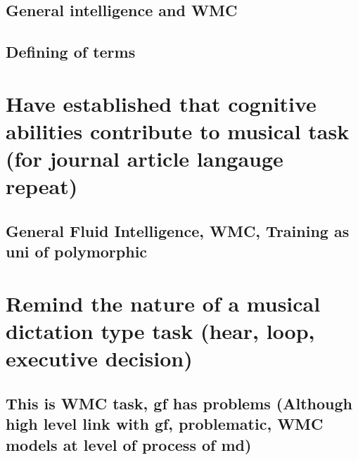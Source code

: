 \documentclass[]{book}
\theoremstyle{definition}
\theoremstyle{definition}
\theoremstyle{definition}
\theoremstyle{remark}
\begin{document}
\hypertarget{general-intelligence-and-wmc}{%
\subsection{General intelligence and
WMC}\label{general-intelligence-and-wmc}}

\hypertarget{defining-of-terms}{%
\subsection{Defining of terms}\label{defining-of-terms}}

\hypertarget{have-established-that-cognitive-abilities-contribute-to-musical-task-for-journal-article-langauge-repeat}{%
\section{Have established that cognitive abilities contribute to musical
task (for journal article langauge
repeat)}\label{have-established-that-cognitive-abilities-contribute-to-musical-task-for-journal-article-langauge-repeat}}

\hypertarget{general-fluid-intelligence-wmc-training-as-uni-of-polymorphic}{%
\subsection{General Fluid Intelligence, WMC, Training as uni of
polymorphic}\label{general-fluid-intelligence-wmc-training-as-uni-of-polymorphic}}

\hypertarget{remind-the-nature-of-a-musical-dictation-type-task-hear-loop-executive-decision}{%
\section{Remind the nature of a musical dictation type task (hear, loop,
executive
decision)}\label{remind-the-nature-of-a-musical-dictation-type-task-hear-loop-executive-decision}}

\hypertarget{this-is-wmc-task-gf-has-problems-although-high-level-link-with-gf-problematic-wmc-models-at-level-of-process-of-md}{%
\subsection{This is WMC task, gf has problems (Although high level link
with gf, problematic, WMC models at level of process of
md)}\label{this-is-wmc-task-gf-has-problems-although-high-level-link-with-gf-problematic-wmc-models-at-level-of-process-of-md}}
\end{document}
